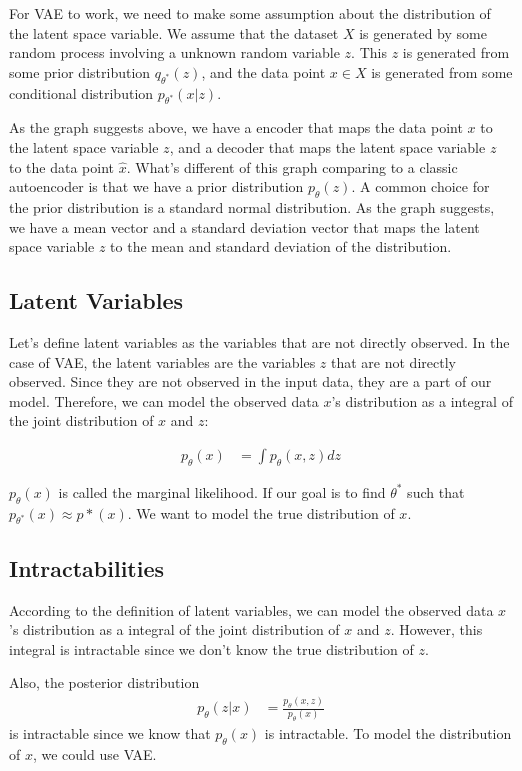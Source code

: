 \documentclass[11pt]{article}
\theoremstyle{definition}
\begin{document}
For VAE to work, we need to make some assumption about the distribution of the latent space variable. We assume that the dataset $X$ is generated by some random process involving a unknown random variable $z$. This $z$ is generated from some prior distribution $q_{\theta^*}(z)$, and the data point $x \in X$ is generated from some conditional distribution $p_{\theta^*}(x|z)$. 

As the graph suggests above, we have a encoder that maps the data point $x$ to the latent space variable $z$, and a decoder that maps the latent space variable $z$ to the data point $\hat{x}$. What's different of this graph comparing to a classic autoencoder is that we have a prior distribution $p_{\theta}(z)$. A common choice for the prior distribution is a standard normal distribution. As the graph suggests, we have a mean vector and a standard deviation vector that maps the latent space variable $z$ to the mean and standard deviation of the distribution.

\subsection{Latent Variables}

Let's define latent variables as the variables that are not directly observed. In the case of VAE, the latent variables are the variables $z$ that are not directly observed. Since they are not observed in the input data, they are a part of our model. Therefore, we can model the observed data $x$'s distribution as a integral of the joint distribution of $x$ and $z$:

\begin{align}
    p_\theta(x) &= \int p_\theta(x, z) dz
\end{align}

$p_\theta(x)$ is called the marginal likelihood. If our goal is to find $\theta^*$ such that $p_{\theta^*}(x) \approx p*(x)$. We want to model the true distribution of $x$. 

\subsection{Intractabilities}

According to the definition of latent variables, we can model the observed data $x$'s distribution as a integral of the joint distribution of $x$ and $z$. However, this integral is intractable since we don't know the true distribution of $z$. 

Also, the posterior distribution 
\begin{align}
    p_\theta(z|x) &= \frac{p_\theta(x, z)}{p_\theta(x)}
\end{align}
is intractable since we know that $p_\theta(x)$ is intractable. To model the distribution of $x$, we could use VAE.
\end{document}
